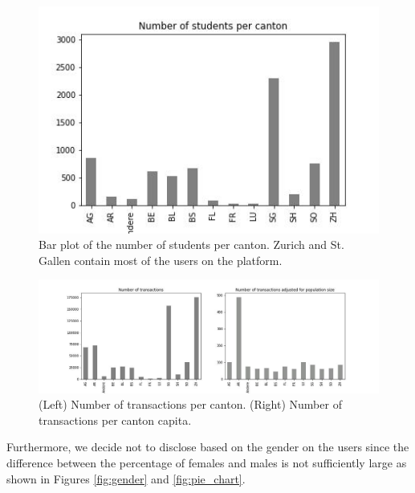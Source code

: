 \documentclass[sigplan,screen]{acmart}
\begin{document}
\begin{figure}
    \centering
    \includegraphics[width=\linewidth]{reports/figures/num_per_canton.jpg}
    \caption{Bar plot of the number of students per canton. Zurich and St. Gallen contain most of the users on the platform.}
    \label{fig:my_label}
\end{figure}

\begin{figure}[!ht]
    \centering
    \includegraphics[width=\linewidth]{reports/figures/cantonal_representation.jpg}
    \caption{(Left) Number of transactions per canton. (Right) Number of transactions per canton capita.}
    \label{fig:cantonal_representation}
\end{figure}

Furthermore, we decide not to disclose based on the gender on the users since the difference between the percentage of females and males is not sufficiently large as shown in Figures \ref{fig:gender} and \ref{fig:pie_chart}.
\end{document}
